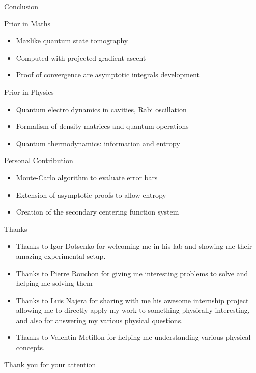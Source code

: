 \documentclass{beamer}
\begin{document}
\begin{frame}{Conclusion}

  \begin{block}{Prior in Maths}
    \begin{itemize}
    \item Maxlike quantum state tomography
    \item Computed with projected gradient ascent
    \item Proof of convergence are asymptotic integrals development
    \end{itemize}
  \end{block}

  \pause{}

  \begin{block}{Prior in Physics}
    \begin{itemize}
    \item Quantum electro dynamics in cavities, Rabi oscillation
    \item Formalism of density matrices and quantum operations
    \item Quantum thermodynamics: information and entropy
    \end{itemize}
  \end{block}

  \pause{}

  \begin{block}{Personal Contribution}
    \begin{itemize}
    \item Monte-Carlo algorithm to evaluate error bars
    \item Extension of asymptotic proofs to allow entropy
    \item Creation of the secondary centering function system
    \end{itemize}
  \end{block}
\end{frame}

\begin{frame}{Thanks}

  \begin{itemize}
  \item Thanks to Igor Dotsenko for welcoming me in his lab and showing me
    their amazing experimental setup.
  \item Thanks to Pierre Rouchon for giving me interesting problems to solve and
    helping me solving them
  \item Thanks to Luis Najera for sharing with me his awesome internship project
    allowing me to directly apply my work to something physically interesting,
    and also for answering my various physical questions.
  \item Thanks to Valentin Metillon for helping me understanding various
    physical concepts.
  \end{itemize}

\end{frame}
\begin{frame}[standout]
  Thank you for your attention
\end{frame}
\end{document}
